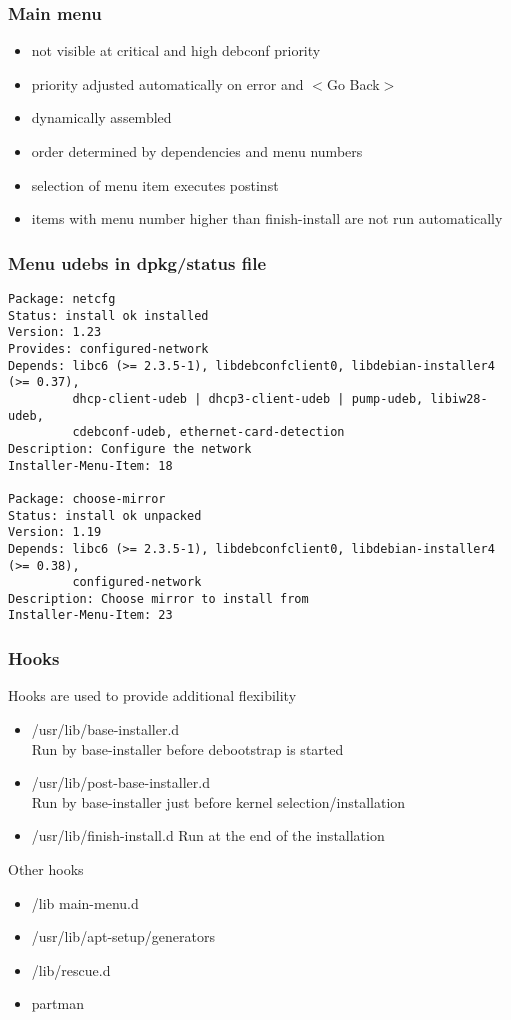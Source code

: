 \documentclass{beamer}
\begin{document}
\begin{frame}
  \frametitle{Main menu}
	\begin{itemize}
	\item
		not visible at critical and high debconf priority
	\item
		priority adjusted automatically on error and $<$Go Back$>$
	\item
		dynamically assembled
	\item
		order determined by dependencies and menu numbers
	\item
		selection of menu item executes postinst
	\item
		items with menu number higher than finish-install are not run automatically
	\end{itemize}
\end{frame}

\begin{frame}[fragile]
  \frametitle{Menu udebs in dpkg/status file}
\begin{tiny}
\begin{verbatim}
Package: netcfg
Status: install ok installed
Version: 1.23
Provides: configured-network
Depends: libc6 (>= 2.3.5-1), libdebconfclient0, libdebian-installer4 (>= 0.37),
         dhcp-client-udeb | dhcp3-client-udeb | pump-udeb, libiw28-udeb,
         cdebconf-udeb, ethernet-card-detection
Description: Configure the network
Installer-Menu-Item: 18

Package: choose-mirror
Status: install ok unpacked
Version: 1.19
Depends: libc6 (>= 2.3.5-1), libdebconfclient0, libdebian-installer4 (>= 0.38),
         configured-network
Description: Choose mirror to install from
Installer-Menu-Item: 23
\end{verbatim}
\end{tiny}
\end{frame}

\begin{frame}
  \frametitle{Hooks}
	Hooks are used to provide additional flexibility
	\begin{itemize}
	\item /usr/lib/base-installer.d \\
		Run by base-installer before debootstrap is started
	\item /usr/lib/post-base-installer.d \\
		Run by base-installer just before kernel selection/installation
	\item /usr/lib/finish-install.d
		Run at the end of the installation
	\end{itemize}

	Other hooks
	\begin{itemize}
	\item /lib main-menu.d
	\item /usr/lib/apt-setup/generators
	\item /lib/rescue.d
	\item partman
	\end{itemize}
\end{frame}
\end{document}
